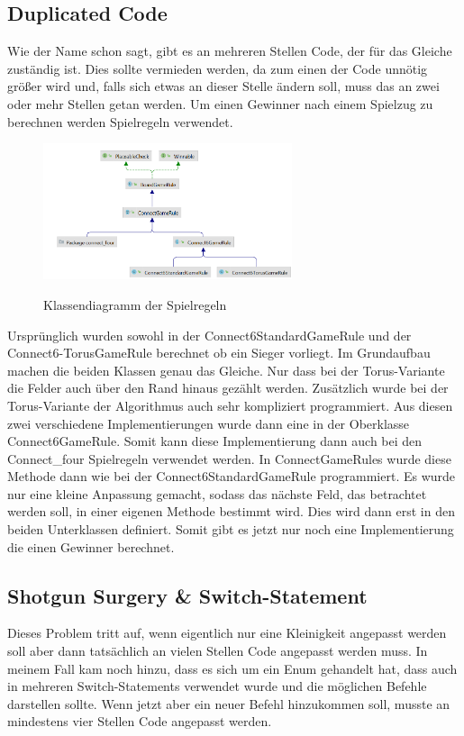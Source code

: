 \documentclass[12pt]{article}
\begin{document}
\subsection{Duplicated Code}
Wie der Name schon sagt, gibt es an mehreren Stellen Code, der für das Gleiche zuständig ist. Dies sollte vermieden werden, da zum einen der Code unnötig größer wird und, falls sich etwas an dieser Stelle ändern soll, muss das an zwei oder mehr Stellen getan werden. Um einen Gewinner nach einem Spielzug zu berechnen werden Spielregeln verwendet.

\begin{figure}[H]
\centering
{\includegraphics[height=4cm]{Bilder/ClassDiagGameRules}}
\caption{Klassendiagramm der Spielregeln}
\label{fig:ClassDiagGameRules}
\end{figure}

Ursprünglich wurden sowohl in der Connect6StandardGameRule und der Connect6-TorusGameRule berechnet ob ein Sieger vorliegt. Im Grundaufbau machen die beiden Klassen genau das Gleiche. Nur dass bei der Torus-Variante die Felder auch über den Rand hinaus gezählt werden. Zusätzlich wurde bei der Torus-Variante der Algorithmus auch sehr kompliziert programmiert. Aus diesen zwei verschiedene Implementierungen wurde dann eine in der Oberklasse Connect6GameRule. Somit kann diese Implementierung dann auch bei den Connect\_four Spielregeln verwendet werden. In ConnectGameRules wurde diese Methode dann wie bei der Connect6StandardGameRule programmiert. Es wurde nur eine kleine Anpassung gemacht, sodass das nächste Feld, das betrachtet werden soll, in einer eigenen Methode bestimmt wird. Dies wird dann erst in den beiden Unterklassen definiert. Somit gibt es jetzt nur noch eine Implementierung die einen Gewinner berechnet.



\subsection{Shotgun Surgery \& Switch-Statement}
Dieses Problem tritt auf, wenn eigentlich nur eine Kleinigkeit angepasst werden soll aber dann tatsächlich an vielen Stellen Code angepasst werden muss. In meinem Fall kam noch hinzu, dass es sich um ein Enum gehandelt hat, dass auch in mehreren Switch-Statements verwendet wurde und die möglichen Befehle darstellen sollte. Wenn jetzt aber ein neuer Befehl hinzukommen soll, musste an mindestens vier Stellen Code angepasst werden.
\\
\end{document}
